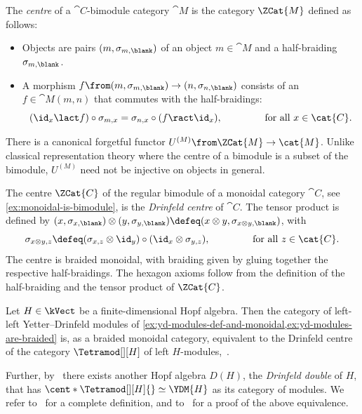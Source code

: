 \begin{definition}\label{def: centre_bimodue_category}
  The \emph{centre} of a \(\cat{C}\)\hyp{}bimodule category \(\cat{M}\) is the category \(\ZCat{M}\) defined as follows:
  \begin{itemize}
    \item Objects are pairs \((m, \sigma_{m, \blank})\) of an object \(m \in \cat{M}\) and a half-braiding \(\sigma_{m,\blank}\).
    \item A morphism \(f \from (m, \sigma_{m,\blank}) \to (n, \sigma_{n,\blank})\) consists of an \(f \in \cat{M}(m,n)\) that commutes with the half-braidings:
    \[
      (\id_x \lact f) \circ \sigma_{m,x} = \sigma_{n,x} \circ (f \ract \id_x), \qquad \qquad \text{ for all } x \in \cat{C}.
    \]
  \end{itemize}
\end{definition}

There is a canonical forgetful functor \(U^{(M)} \from \ZCat{M} \to \cat{M}\).
Unlike classical representation theory where the centre of a bimodule is a subset of the bimodule,
\(U^{(M)}\) need not be injective on objects in general.

\begin{example}\label{ex: Drinfeld_centre}
  The centre \(\ZCat{C}\) of the regular bimodule of a monoidal category \(\cat{C}\),
  see \cref{ex:monoidal-is-bimodule},
  is the \emph{Drinfeld centre} of \(\cat{C}\).
  The tensor product is defined by
  \((x, \sigma_{x, \blank}) \otimes (y, \sigma_{y, \blank}) \defeq ( x \otimes y, \sigma_{x\otimes y, \blank})\), with
  \[
    \sigma_{x\otimes y, z} \defeq (\sigma_{x, z} \otimes \id_y) \circ ({\id_x} \otimes \sigma_{y, z}), \qquad \qquad \text{ for all } z \in \cat{C}.
  \]
  The centre is braided monoidal, with braiding given by gluing together the respective half-braidings.
  The hexagon axioms follow from the definition of the half-braiding and the tensor product of \(\ZCat{C}\).
\end{example}

\begin{example}\label{ex:yd-modules-as-drinfeld-centre}
  Let \(H \in \kVect\) be a finite-dimensional Hopf algebra.
  Then the category of left-left Yetter–Drinfeld modules
  of \cref{ex:yd-modules-def-and-monoidal,ex:yd-modules-are-braided}
  is, as a braided monoidal category,
  equivalent to the Drinfeld centre of the category \(\Tetramod[][H]\) of left \(H\)\hyp{}modules,~\cite{drinfeld87:quant,yetter90:quant}.

  Further, by~\cite{drinfeld87:quant} there exists another Hopf algebra \(D(H)\),
  the \emph{Drinfeld double} of \(H\),
  that has \(\cent*{\Tetramod[][H]{}} \simeq \YDM{H}\) as its category of modules.
  We refer to~\cite[Definition~\textsc{ix}.4.1]{Kassel1998}
  for a complete definition,
  and to~\cite[Theorem~\textsc{xiii}.5.1]{Kassel1998}
  for a proof of the above equivalence.
\end{example}

